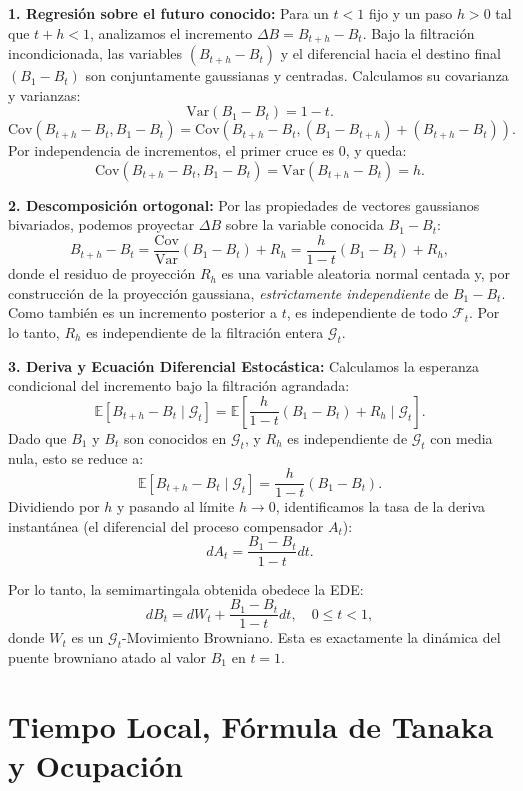 \documentclass[11pt, letterpaper]{article}
\begin{document}
\begin{solucion}
    \textbf{1. Regresión sobre el futuro conocido:}
    Para un $t < 1$ fijo y un paso $h > 0$ tal que $t+h < 1$, analizamos el incremento $\Delta B = B_{t+h} - B_t$.
    Bajo la filtración incondicionada, las variables $(B_{t+h} - B_t)$ y el diferencial hacia el destino final $(B_1 - B_t)$ son conjuntamente gaussianas y centradas.
    Calculamos su covarianza y varianzas:
    \[ \text{Var}(B_1 - B_t) = 1 - t. \]
    \[ \text{Cov}(B_{t+h} - B_t, B_1 - B_t) = \text{Cov}(B_{t+h} - B_t, (B_1 - B_{t+h}) + (B_{t+h} - B_t)). \]
    Por independencia de incrementos, el primer cruce es 0, y queda:
    \[ \text{Cov}(B_{t+h} - B_t, B_1 - B_t) = \text{Var}(B_{t+h} - B_t) = h. \]

    \textbf{2. Descomposición ortogonal:}
    Por las propiedades de vectores gaussianos bivariados, podemos proyectar $\Delta B$ sobre la variable conocida $B_1 - B_t$:
    \[ B_{t+h} - B_t = \frac{\text{Cov}}{\text{Var}} (B_1 - B_t) + R_h = \frac{h}{1-t}(B_1 - B_t) + R_h, \]
    donde el residuo de proyección $R_h$ es una variable aleatoria normal centada y, por construcción de la proyección gaussiana, \textit{estrictamente independiente} de $B_1 - B_t$. Como también es un incremento posterior a $t$, es independiente de todo $\mathcal{F}_t$. Por lo tanto, $R_h$ es independiente de la filtración entera $\mathcal{G}_t$.

    \textbf{3. Deriva y Ecuación Diferencial Estocástica:}
    Calculamos la esperanza condicional del incremento bajo la filtración agrandada:
    \[ \mathbb{E}[B_{t+h} - B_t \mid \mathcal{G}_t] = \mathbb{E}\left[ \frac{h}{1-t}(B_1 - B_t) + R_h \mid \mathcal{G}_t \right]. \]
    Dado que $B_1$ y $B_t$ son conocidos en $\mathcal{G}_t$, y $R_h$ es independiente de $\mathcal{G}_t$ con media nula, esto se reduce a:
    \[ \mathbb{E}[B_{t+h} - B_t \mid \mathcal{G}_t] = \frac{h}{1-t}(B_1 - B_t). \]
    Dividiendo por $h$ y pasando al límite $h \to 0$, identificamos la tasa de la deriva instantánea (el diferencial del proceso compensador $A_t$):
    \[ dA_t = \frac{B_1 - B_t}{1 - t} dt. \]
    
    Por lo tanto, la semimartingala obtenida obedece la EDE:
    \[ dB_t = dW_t + \frac{B_1 - B_t}{1 - t} dt, \quad 0 \le t < 1, \]
    donde $W_t$ es un $\mathcal{G}_t$-Movimiento Browniano. Esta es exactamente la dinámica del puente browniano atado al valor $B_1$ en $t=1$.
\end{solucion}

\newpage

\section{Tiempo Local, Fórmula de Tanaka y Ocupación}
\end{document}
